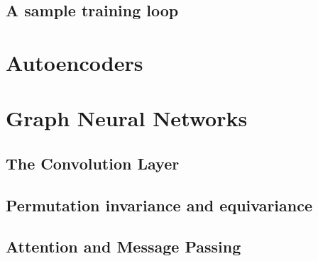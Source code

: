 \subsection{A sample training loop}












\section{Autoencoders}





\section{Graph Neural Networks}
\subsection{The Convolution Layer}
\subsection{Permutation invariance and equivariance}
\subsection{Attention and Message Passing}

